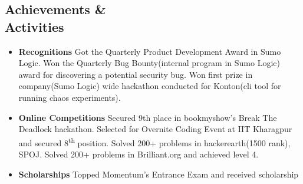 \documentclass[margin,line]{resume}
\begin{document}
\begin{resume}
\section{\mysidestyle Achievements \& \\ Activities}
\vspace{0mm}
    \begin{itemize}
            \item \textbf{Recognitions} \vspace{0mm}
                \subitem Got the Quarterly Product Development Award in Sumo Logic.
                \subitem Won the Quarterly Bug Bounty(internal program in Sumo Logic) award for discovering a potential security bug.
                \subitem Won first prize in company(Sumo Logic) wide hackathon conducted for Konton(cli tool for running chaos experiments).
            \item \textbf{Online Competitions} \vspace{0mm}
                \subitem Secured 9th place in bookmyshow's Break The Deadlock hackathon.
                \subitem Selected for Overnite Coding Event at IIT Kharagpur and secured 8​\textsuperscript{th}​ position.
                \subitem Solved 200+ problems in hackerearth(1500 rank), SPOJ.
                \subitem Solved 200+ problems in Brilliant.org and achieved level 4.
            \item \textbf{Scholarships} \vspace{0mm}
                \subitem Topped Momentum's Entrance Exam and received scholarship
            
    \end{itemize}




\end{resume}
\end{document}
